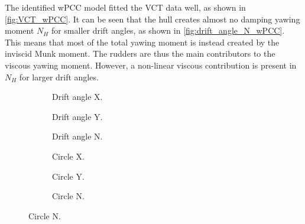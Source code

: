\noindent The identified wPCC model fitted the VCT data well, as shown in \autoref{fig:VCT_wPCC}. 
It can be seen that the hull creates almost no damping yawing moment $N_H$ for smaller drift angles, as shown in \autoref{fig:drift_angle_N_wPCC}. This means that most of the total yawing moment is instead created by the inviscid Munk moment. The rudders are thus the main contributors to the viscous yawing moment. However, a non-linear viscous contribution is present in $N_H$ for larger drift angles. 
\begin{figure}[h]
     \centering
     \begin{subfigure}[b]{0.32\textwidth}
         \centering
        
        \caption{Drift angle X.}
        \label{fig:drift_angle_X_wPCC}
     \end{subfigure}
     \hfill
     \begin{subfigure}[b]{0.32\textwidth}
         \centering
         
        \caption{Drift angle Y.}
        \label{fig:drift_angle_Y_wPCC}
     \end{subfigure}
     \hfill
     \begin{subfigure}[b]{0.32\textwidth}
         \centering
         
        \caption{Drift angle N.}
        \label{fig:drift_angle_N_wPCC}
     \end{subfigure}
    \vfill
    
     \begin{subfigure}[b]{0.32\textwidth}
         \centering
         
        \caption{Circle X.}
        \label{fig:circle_X_wPCC}
     \end{subfigure}
     \hfill
     \begin{subfigure}[b]{0.32\textwidth}
         \centering
         
        \caption{Circle Y.}
        \label{fig:circle_Y_wPCC}
     \end{subfigure}
     \hfill
     \begin{subfigure}[b]{0.32\textwidth}
         \centering
         
        \caption{Circle N.}
        \label{fig:circle_N_wPCC}
     \end{subfigure}


\end{figure}
